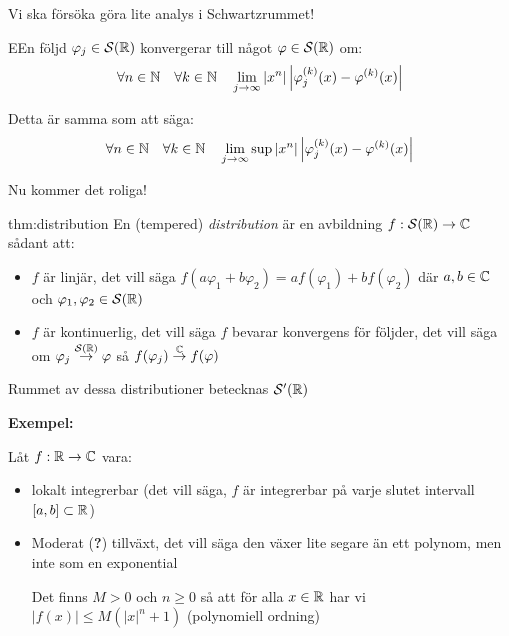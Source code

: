 \par\bigskip
\noindent Vi ska försöka göra lite analys i Schwartzrummet!
\par\bigskip
\begin{theo}
  EEn följd $\varphi_j\in\mathcal{S}(\mathbb{R})$ konvergerar till något $\varphi\in\mathcal{S}(\mathbb{R})$ om:
  \begin{equation*}
    \begin{gathered}
      \forall n\in\mathbb{N}\quad\forall k\in\mathbb{N}\quad\lim_{j\to\infty}\left|x^n\right|\left|\varphi_j^{(k)}(x)-\varphi^{(k)}(x)\right|
    \end{gathered}
  \end{equation*}\par
  \noindent Detta är samma som att säga:
  \begin{equation*}
    \begin{gathered}
      \forall n\in\mathbb{N}\quad\forall k\in\mathbb{N}\quad\lim_{j\to\infty}\sup{\left|x^n\right|\left|\varphi_j^{(k)}(x)-\varphi^{(k)}(x)\right|}
    \end{gathered}
  \end{equation*}
\end{theo}
\par\bigskip
\noindent Nu kommer det roliga!
\par\bigskip
\begin{theo}[Distribution]{thm:distribution}
  En (tempered) \textit{distribution }är en avbildning $f:\mathcal{S}(\mathbb{R})\to\mathbb{C}$ sådant att:\par
  \begin{itemize}
    \item $f$ är linjär, det vill säga $f(a\varphi_1+b\varphi_2) = af(\varphi_1)+bf(\varphi_2)$ där $a,b\in\mathbb{C}$ och $\varphi_1,\varphi_2\in\mathcal{S}(\mathbb{R})$
      \par\bigskip
    \item $f$ är kontinuerlig, det vill säga $f$ bevarar konvergens för följder, det vill säga om $\varphi_j\stackrel{\mathcal{S}(\mathbb{R})}{\to}\varphi$ så $f(\varphi_j)\stackrel{\mathbb{C}}{\to}f(\varphi)$
  \end{itemize}
  \par\bigskip
  \noindent Rummet av dessa distributioner betecknas $\mathcal{S}^{\prime}(\mathbb{R})$
\end{theo}
\par\bigskip
\noindent\textbf{Exempel:}\par
\noindent Låt $f:\mathbb{R}\to\mathbb{C}$ vara:\par
\begin{itemize}
  \item lokalt integrerbar (det vill säga, $f$ är integrerbar på varje slutet intervall $[a,b]\subset\mathbb{R}$)
    \par\bigskip
  \item Moderat (\textbf{?}) tillväxt, det vill säga den växer lite segare än ett polynom, men inte som en exponential\par
    \noindent Det finns $M>0$ och $n\geq0$ så att för alla $x\in\mathbb{R}$ har vi $\left|f(x)\right|\leq M(\left|x\right|^n+1)$ (polynomiell ordning)
\end{itemize}
